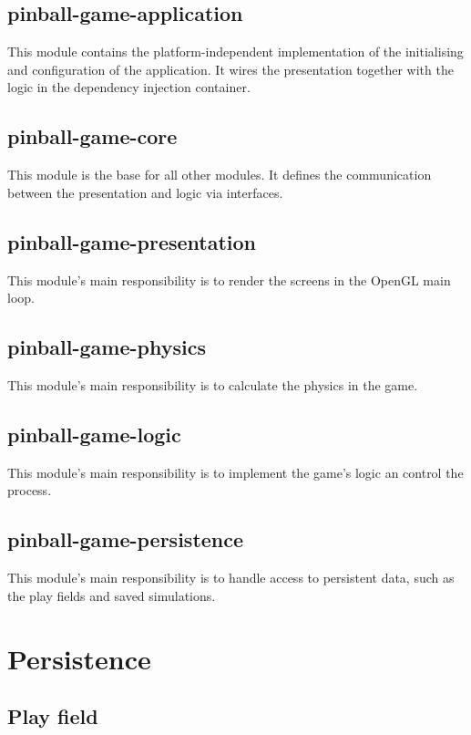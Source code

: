 \documentclass[fontsize=12pt,
               paper=a4,
               twoside=false,
               parskip=half,
               ]{scrartcl}
\begin{document}
\subsection{pinball-game-application}

This module contains the platform-independent implementation of the initialising and configuration of the application. It wires the presentation together with the logic in the dependency injection container.

\subsection{pinball-game-core}

This module is the base for all other modules. It defines the communication between the presentation and logic via interfaces.

\subsection{pinball-game-presentation}

This module's main responsibility is to render the screens in the OpenGL main loop.

\subsection{pinball-game-physics}

This module's main responsibility is to calculate the physics in the game.

\subsection{pinball-game-logic}

This module's main responsibility is to implement the game's logic an control the process.

\subsection{pinball-game-persistence}

This module's main responsibility is to handle access to persistent data, such as the play fields and saved simulations.

\section{Persistence}

\subsection{Play field}
\end{document}
